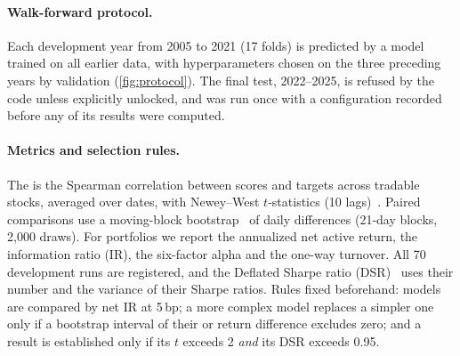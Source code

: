 \paragraph{Walk-forward protocol.}
Each development year from 2005 to 2021 (17 folds) is predicted by a model trained on all earlier data, with hyperparameters chosen on the three preceding years by validation \ric{} (\cref{fig:protocol}).
The final test, 2022--2025, is refused by the code unless explicitly unlocked, and was run once with a configuration recorded before any of its results were computed.

\paragraph{Metrics and selection rules.}
The \ric{} is the Spearman correlation between scores and targets across tradable stocks, averaged over dates, with Newey--West $t$-statistics (10 lags)~\cite{newey1987simple}.
Paired comparisons use a moving-block bootstrap~\cite{kunsch1989jackknife} of daily differences (21-day blocks, 2,000 draws).
For portfolios we report the annualized net active return, the information ratio (IR), the six-factor alpha and the one-way turnover.
All 70 development runs are registered, and the Deflated Sharpe ratio (DSR)~\cite{bailey2014deflated} uses their number and the variance of their Sharpe ratios.
Rules fixed beforehand: models are compared by net IR at 5\,bp; a more complex model replaces a simpler one only if a bootstrap interval of their \ric{} or return difference excludes zero; and a result is established only if its $t$ exceeds 2 \emph{and} its DSR exceeds 0.95.
